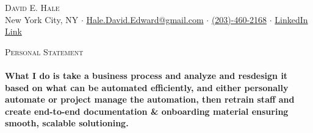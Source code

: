 \documentclass[a4paper]{article}
\newcommand{\lineunder} {
    \vspace*{-8pt} \\
    \hspace*{-18pt} \hrulefill \\
}
\newcommand{\header} [1] {
    {\hspace*{-18pt}\vspace*{6pt} \textsc{#1}}
    \vspace*{-6pt} \lineunder
}
\begin{document}
\vspace*{-40pt}

    

\vspace*{-9pt}
\begin{center}
	{\Large \scshape {David E. Hale}}\\
	New York City, NY $\cdot$ \href{mailto:Hale.David.Edward@gmail.com}{Hale.David.Edward@gmail.com} $\cdot$ \href{tel:203-460-2168}{(203)-460-2168} $\cdot$ \href{http://linkedin.com/in/david-hale-2598a791/}{LinkedIn Link}
\end{center}

\header{Personal Statement}
\vspace{1mm}
\textbf{What I do is take a business process and analyze and resdesign it based on what can be automated efficiently, and either personally automate or project manage the automation,
        then retrain staff and create end-to-end documentation \& onboarding material ensuring smooth, scalable solutioning.
}
\end{document}
